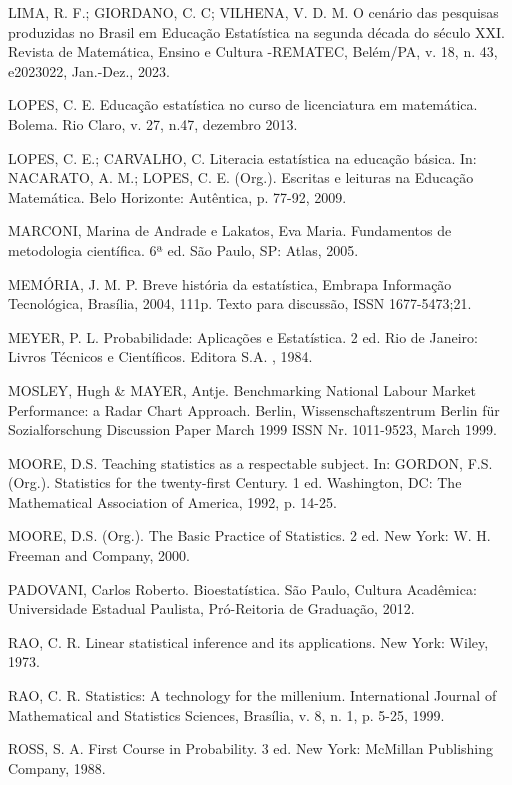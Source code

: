 LIMA, R. F.; GIORDANO, C. C; VILHENA,  V. D. M. O cenário das  pesquisas produzidas no   Brasil   em   Educação   Estatística   na   segunda   década   do   século   XXI. Revista   de Matemática, Ensino e Cultura -REMATEC, Belém/PA, v. 18, n. 43, e2023022, Jan.-Dez., 2023.\vskip0.3cm

LOPES, C. E. Educação estatística no curso de licenciatura em matemática. Bolema. Rio Claro, v. 27, n.47,  dezembro 2013.
\vskip0.3cm

LOPES, C. E.; CARVALHO, C. Literacia estatística na educação básica. In: NA\-CA\-RA\-TO, A. M.; LOPES, C. E. (Org.). Escritas e leituras na Educação Matemática. Belo Horizonte:  Autêntica, p. 77-92, 2009.\vskip0.3cm

MARCONI, Marina de Andrade e Lakatos, Eva Maria. Fundamentos de me\-to\-do\-lo\-gi\-a científica. 6ª ed. São Paulo, SP: Atlas, 2005.\vskip0.3cm

MEMÓRIA, J. M. P. Breve história da estatística, Embrapa Informação Tecnológica, Brasília, 2004, 111p. Texto para discussão, ISSN 1677-5473;21. \vskip0.3cm

MEYER, P. L. Probabilidade: Aplicações e Estatística. 2 ed.
Rio de Janeiro: Livros Técnicos e Científicos. Editora S.A. ,
1984.\vskip0.3cm

MOSLEY, Hugh \& MAYER, Antje. Benchmarking National Labour Market
Performance: a Radar Chart Approach. Berlin, Wissenschaftszentrum Berlin
für Sozialforschung Discussion Paper March 1999 ISSN Nr. 1011-9523, March
1999.\vskip0.3cm


MOORE, D.S. Teaching statistics as a respectable subject. In: GORDON, F.S. (Org.). Statistics for the twenty-first Century. 1 ed. Washington, DC: The Mathematical Association of America, 1992, p. 14-25.\vskip0.3cm

MOORE, D.S. (Org.). The Basic Practice of Statistics. 2 ed. New York: W. H. Freeman and Company, 2000. \vskip0.3cm

PADOVANI, Carlos Roberto. Bioestatística. São Paulo, Cultura Acadêmica:
Universidade Estadual Paulista, Pró-Reitoria de Graduação, 2012.\vskip0.3cm

RAO, C. R. Linear statistical inference and its applications. New York: Wiley, 1973.\vskip0.3cm

RAO, C. R. Statistics: A technology for the millenium. International Journal of Mathematical and Statistics Sciences, Brasília, v. 8, n. 1, p. 5-25, 1999.\vskip0.3cm

ROSS, S. A. First Course in Probability. 3 ed. New York:
McMillan Publishing Company, 1988.\vskip0.3cm

